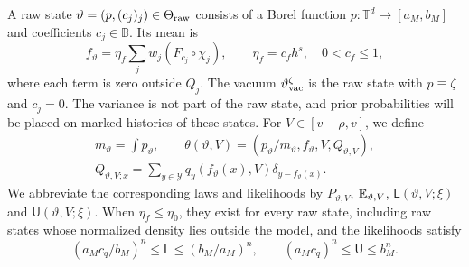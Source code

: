 A raw state $\vartheta=(p,(c_j)_j)\in\Theta_{\rm raw}$ consists of a
Borel function $p:\mathbb T^d\to[a_M,b_M]$ and coefficients
$c_j\in\mathbb B$. Its mean is
\begin{equation}\label{eq:LB-mean}
 f_\vartheta=\eta_f\sum_j w_j(F_{c_j}\circ\chi_j),\qquad
 \eta_f=c_fh^s,\quad 0<c_f\le1,
\end{equation}
where each term is zero outside $Q_j$. The vacuum
$\vartheta^\zeta_{\rm vac}$ is the raw state with $p\equiv\zeta$ and
$c_j=0$. The variance is not part of the raw state, and prior
probabilities will be placed on marked histories of these states.
For $V\in[v-\rho,v]$, we define
\begin{equation}\label{eq:LB-normalization}
 \begin{gathered}
 m_\vartheta=\int p_\vartheta,\qquad
 \theta(\vartheta,V)=(p_\vartheta/m_\vartheta,f_\vartheta,V,Q_{\vartheta,V}),\\
 Q_{\vartheta,V;x}
 =\sum_{y\in\mathcal Y}q_y(f_\vartheta(x),V)\delta_{y-f_\vartheta(x)}.
 \end{gathered}
\end{equation}
We abbreviate the corresponding laws and likelihoods by
$P_{\vartheta,V}$, $\mathbb E_{\vartheta,V}$, $\mathsf L(\vartheta,V;\xi)$ and
$\mathsf U(\vartheta,V;\xi)$. When $\eta_f\le\eta_0$, they exist for
every raw state, including raw states whose normalized density lies
outside the model, and the likelihoods satisfy
\begin{equation}\label{eq:LB-likelihood-bounds}
 (a_Mc_q/b_M)^n\le\mathsf L\le(b_M/a_M)^n,\qquad
 (a_Mc_q)^n\le\mathsf U\le b_M^n.
\end{equation}

